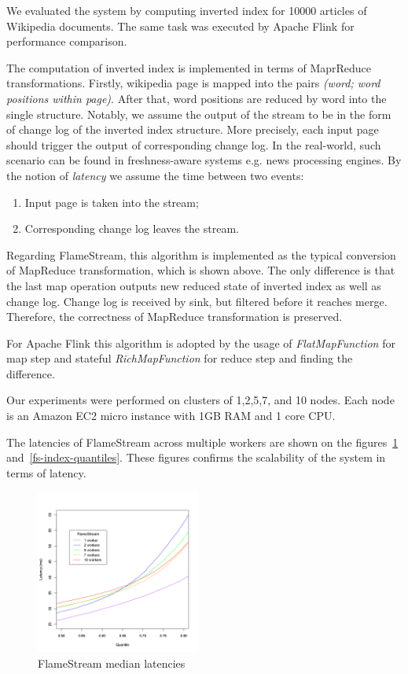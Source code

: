 
\label {fs-experiments-section}

We evaluated the system by computing inverted index for 10000 articles of Wikipedia documents. The same task was executed by Apache Flink for performance comparison.

The computation of inverted index is implemented in terms of MaprReduce transformations. Firstly, wikipedia page is mapped into the pairs {\it (word; word positions within page)}. After that, word positions are reduced by word into the single structure. Notably, we assume the output of the stream to be in the form of change log of the inverted index structure. More precisely, each input page should trigger the output of corresponding change log. In the real-world, such scenario can be found in freshness-aware systems e.g. news processing engines. By the notion of {\it latency} we assume the time between two events: 
\begin{enumerate}
    \item Input page is taken into the stream;
    \item Corresponding change log leaves the stream.
\end{enumerate}

Regarding FlameStream, this algorithm is implemented as the typical conversion of MapReduce transformation, which is shown above. The only difference is that the last map operation outputs new reduced state of inverted index as well as change log. Change log is received by sink, but filtered before it reaches merge. Therefore, the correctness of MapReduce transformation is preserved.

For Apache Flink this algorithm is adopted by the usage of {\it FlatMapFunction} for map step and stateful {\it RichMapFunction} for reduce step and finding the difference.

Our experiments were performed on clusters of 1,2,5,7, and 10 nodes. Each node is an Amazon EC2 micro instance with 1GB RAM and 1 core CPU.

The latencies of FlameStream across multiple workers are shown on the figures~\ref{fs-index-median} and~\ref{fs-index-quantiles}. These figures confirms the scalability of the system in terms of latency.

\begin{figure}[htbp]
  \centering
  \includegraphics[width=0.48\textwidth]{pics/fs-index-median}
  \caption{FlameStream median latencies}
  \label {fs-index-median}
\end{figure}

